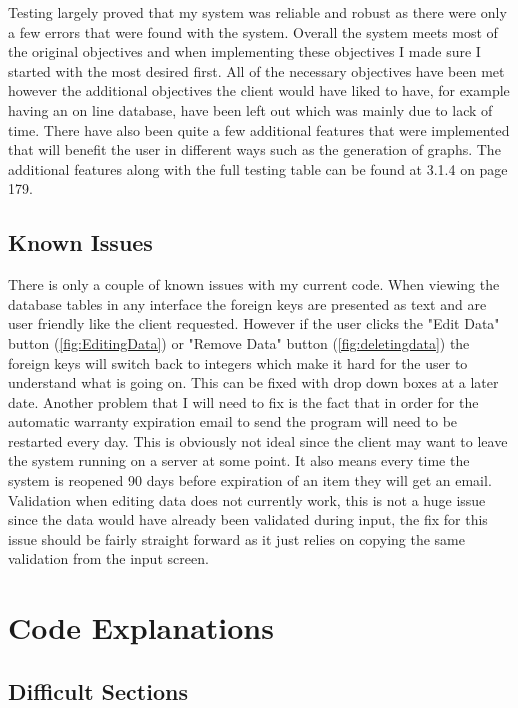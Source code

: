 Testing largely proved that my system was reliable and robust as there were only a few errors that were found with the system. Overall the system meets most of the original objectives and when implementing these objectives I made sure I started with the most desired first. All of the necessary objectives have been met however the additional objectives the client would have liked to have, for example having an on line database, have been left out which was mainly due to lack of time. There have also been quite a few additional features that were implemented that will benefit the user in different ways such as the generation of graphs. The additional features along with the full testing table can be found at 3.1.4 on page 179.

\subsection{Known Issues}

There is only a couple of known issues with my current code. When viewing the database tables in any interface the foreign keys are presented as text and are user friendly like the client requested. However if the user clicks the "Edit Data" button (\ref{fig:EditingData}) or "Remove Data" button (\ref{fig:deletingdata}) the foreign keys will switch back to integers which make it hard for the user to understand what is going on. This can be fixed with drop down boxes at a later date. Another problem that I will need to fix is the fact that in order for the automatic warranty expiration email to send the program will need to be restarted every day. This is obviously not ideal since the client may want to leave the system running on a server at some point. It also means every time the system is reopened 90 days before expiration of an item they will get an email. Validation when editing data does not currently work, this is not a huge issue since the data would have already been validated during input, the fix for this issue should be fairly straight forward as it just relies on copying the same validation from the input screen.

\section{Code Explanations}

\subsection{Difficult Sections}

